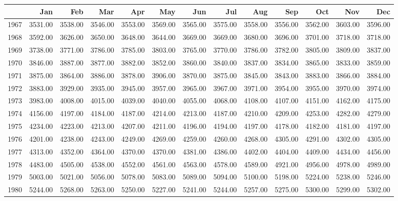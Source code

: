 \begin{longtable}{rrrrrrrrrrrrr}
  \hline
 & Jan & Feb & Mar & Apr & May & Jun & Jul & Aug & Sep & Oct & Nov & Dec \\ 
  \hline
1967 & 3531.00 & 3538.00 & 3546.00 & 3553.00 & 3569.00 & 3565.00 & 3575.00 & 3558.00 & 3556.00 & 3562.00 & 3603.00 & 3596.00 \\ 
  1968 & 3592.00 & 3626.00 & 3650.00 & 3648.00 & 3644.00 & 3669.00 & 3669.00 & 3680.00 & 3696.00 & 3701.00 & 3718.00 & 3718.00 \\ 
  1969 & 3738.00 & 3771.00 & 3786.00 & 3785.00 & 3803.00 & 3765.00 & 3770.00 & 3786.00 & 3782.00 & 3805.00 & 3809.00 & 3837.00 \\ 
  1970 & 3846.00 & 3887.00 & 3877.00 & 3882.00 & 3852.00 & 3860.00 & 3840.00 & 3837.00 & 3834.00 & 3865.00 & 3833.00 & 3859.00 \\ 
  1971 & 3875.00 & 3864.00 & 3886.00 & 3878.00 & 3906.00 & 3870.00 & 3875.00 & 3845.00 & 3843.00 & 3883.00 & 3866.00 & 3884.00 \\ 
  1972 & 3883.00 & 3929.00 & 3935.00 & 3945.00 & 3957.00 & 3965.00 & 3967.00 & 3971.00 & 3954.00 & 3955.00 & 3970.00 & 3974.00 \\ 
  1973 & 3983.00 & 4008.00 & 4015.00 & 4039.00 & 4040.00 & 4055.00 & 4068.00 & 4108.00 & 4107.00 & 4151.00 & 4162.00 & 4175.00 \\ 
  1974 & 4156.00 & 4197.00 & 4184.00 & 4187.00 & 4214.00 & 4213.00 & 4187.00 & 4210.00 & 4209.00 & 4253.00 & 4282.00 & 4279.00 \\ 
  1975 & 4234.00 & 4223.00 & 4213.00 & 4207.00 & 4211.00 & 4196.00 & 4194.00 & 4197.00 & 4178.00 & 4182.00 & 4181.00 & 4197.00 \\ 
  1976 & 4201.00 & 4238.00 & 4243.00 & 4249.00 & 4269.00 & 4259.00 & 4260.00 & 4268.00 & 4305.00 & 4291.00 & 4302.00 & 4305.00 \\ 
  1977 & 4313.00 & 4352.00 & 4364.00 & 4370.00 & 4370.00 & 4381.00 & 4386.00 & 4402.00 & 4404.00 & 4409.00 & 4434.00 & 4456.00 \\ 
  1978 & 4483.00 & 4505.00 & 4538.00 & 4552.00 & 4561.00 & 4563.00 & 4578.00 & 4589.00 & 4921.00 & 4956.00 & 4978.00 & 4989.00 \\ 
  1979 & 5003.00 & 5021.00 & 5056.00 & 5078.00 & 5083.00 & 5089.00 & 5094.00 & 5100.00 & 5198.00 & 5224.00 & 5238.00 & 5246.00 \\ 
  1980 & 5244.00 & 5268.00 & 5263.00 & 5250.00 & 5227.00 & 5241.00 & 5244.00 & 5257.00 & 5275.00 & 5300.00 & 5299.00 & 5302.00 \\ 

\end{longtable}
